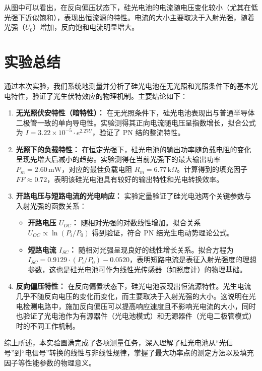 \documentclass[11pt]{article}
\begin{document}
从图中可以看出，在反向偏压状态下，硅光电池的电流随电压变化较小（尤其在低光强下近似饱和），表现出恒流源的特性。电流的大小主要取决于入射光强，随着光强（$U_0$）增加，反向饱和电流明显增大。

\section{实验总结}

通过本次实验，我们系统地测量并分析了硅光电池在无光照和光照条件下的基本光电特性，验证了光生伏特效应的物理机制。主要结论如下：

\begin{enumerate}
    \item \textbf{无光照伏安特性（暗特性）：}
    在无光照条件下，硅光电池表现出与普通半导体二极管一致的单向导电性。实验测得其正向电流随电压呈指数增长，拟合公式为 $I = 3.22 \times 10^{-5} \cdot e^{2.27 U}$，验证了 PN 结的整流特性。

    \item \textbf{光照下的负载特性：}
    在恒定光强下，硅光电池的输出功率随负载电阻的变化呈现先增大后减小的趋势。实验测得在当前光强下的最大输出功率 $P_m = 2.60\,\text{mW}$，对应的最佳负载电阻 $R_m = 6.77\,\text{k}\Omega$。计算得到的填充因子 $FF \approx 0.72$，表明该硅光电池具有较好的输出特性和光电转换效率。

    \item \textbf{开路电压与短路电流的光电响应：}
    实验定量验证了硅光电池两个关键参数与入射光强的函数关系：
    \begin{itemize}
        \item \textbf{开路电压 $U_{OC}$：} 随相对光强的对数线性增加。拟合关系 $U_{OC} \propto \ln(P_i/P_0)$ 得到验证，符合 PN 结光生电动势理论公式。
        \item \textbf{短路电流 $I_{SC}$：} 随相对光强呈现良好的线性增长关系。拟合方程为 $I_{SC} = 0.9129 \cdot (P_i/P_0) - 0.0520$，表明短路电流是表征入射光强度的理想参数，这也是硅光电池可作为线性光传感器（如照度计）的物理基础。
    \end{itemize}

    \item \textbf{反向偏压特性：}
    在反向偏置状态下，硅光电池表现出恒流源特性。光生电流几乎不随反向电压的变化而变化，而主要取决于入射光强的大小。这说明在光电检测电路中，施加反向偏压可以提高响应速度且不影响光电流的大小，同时也验证了光电池作为有源器件（光电池模式）和无源器件（光电二极管模式）时的不同工作机制。
\end{enumerate}

综上所述，本实验圆满完成了各项测量任务，深入理解了硅光电池从“光信号”到“电信号”转换的线性与非线性规律，掌握了最大功率点的测定方法以及填充因子等性能参数的物理意义。
\end{document}
